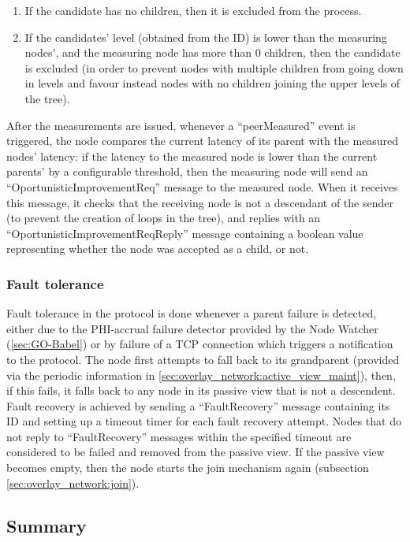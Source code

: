 \begin{enumerate}
    \item If the candidate has no children, then it is excluded from the process.
    
    \item If the candidates' level (obtained from the ID) is lower than the measuring nodes', and the measuring node has more than 0 children, then the candidate is excluded (in order to prevent nodes with multiple children from going down in levels and favour instead nodes with no children joining the upper levels of the tree).
\end{enumerate}

After the measurements are issued, whenever a ``peerMeasured'' event is triggered, the node compares the current latency of its parent with the measured nodes' latency: if the latency to the measured node is lower than the current parents' by a configurable threshold, then the measuring node will send an ``OportunisticImprovementReq'' message to the measured node. When it receives this message, it checks that the receiving node is not a descendant of the sender (to prevent the creation of loops in the tree), and replies with an ``OportunisticImprovementReqReply'' message containing a boolean value representing whether the node was accepted as a child, or not.


\subsubsection{Fault tolerance}

Fault tolerance in the protocol is done whenever a parent failure is detected, either due to the PHI-accrual failure detector provided by the Node Watcher (\ref{sec:GO-Babel}) or by failure of a TCP connection which triggers a notification to the protocol. The node first attempts to fall back to its grandparent (provided via the periodic information in \ref{sec:overlay_network:active_view_maint}), then, if this fails, it falls back to any node in its passive view that is not a descendent. Fault recovery is achieved by sending a ``FaultRecovery'' message containing its ID and setting up a timeout timer for each fault recovery attempt. Nodes that do not reply to ``FaultRecovery'' messages within the specified timeout are considered to be failed and removed from the passive view. If the passive view becomes empty, then the node starts the join mechanism again (subsection \ref{sec:overlay_network:join}).

\subsection{Summary}

